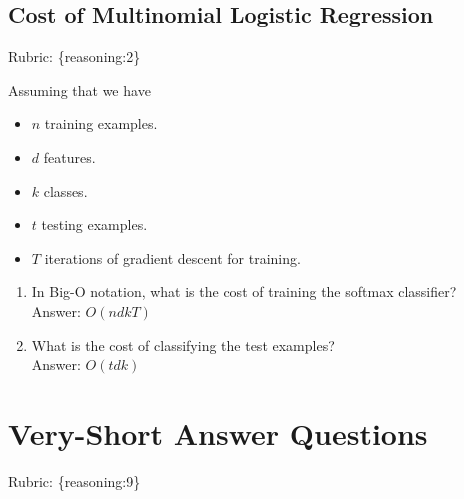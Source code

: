 \documentclass{article}
\def\rubric#1{\gre{Rubric: \{#1\}}}{}
\def\blu#1{{\color{blu}#1}}
\def\gre#1{{\color{gre}#1}}
\def\items#1{\begin{itemize}#1\end{itemize}}
\def\enum#1{\begin{enumerate}#1\end{enumerate}}
\begin{document}
\subsection{Cost of Multinomial Logistic Regression}
\rubric{reasoning:2}

Assuming that we have
\items{
\item $n$ training examples.
\item $d$ features.
\item $k$ classes.
\item $t$ testing examples.
\item $T$ iterations of gradient descent for training.
}
\enum{
\item In Big-O notation, what is the cost of training the softmax classifier? \\
\blu{Answer: $O(ndkT)$}
\item What is the cost of classifying the test examples? \\
\blu{Answer: $O(tdk)$}
}




\section{Very-Short Answer Questions}
\rubric{reasoning:9}
\end{document}
